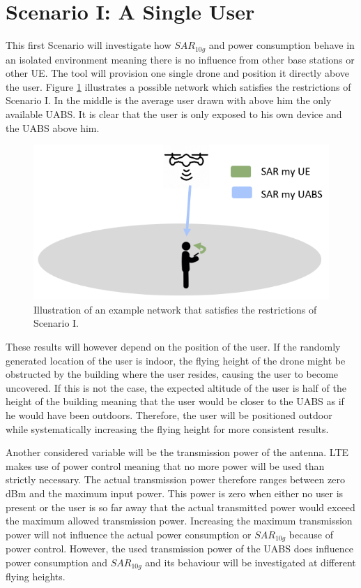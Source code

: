 \section{Scenario I: A Single User}
\label{sec:scenarios_s1}

This first Scenario will investigate how $SAR_{10g}$ and power consumption behave in an isolated environment meaning there is no influence 
from other base stations or other \gls{UE}. The tool will provision one single drone and position it directly above the user.
Figure \ref{fig:IllustrationS1} illustrates a possible network which satisfies the restrictions of Scenario I. In the middle is the average user drawn with above him the only available \gls{UABS}.
It is clear that the user is only exposed to his own device and the \gls{UABS} above him.
\begin{figure}[H]
\centering
  \includegraphics[width=\textwidth/3*2]{../images/IllustrationS1.png}
  \caption{Illustration of an example network that satisfies the restrictions of Scenario I.}
  \label{fig:IllustrationS1}
\end{figure}


These results will however depend on the position of the user. If the randomly generated location of the user is indoor, 
the flying height of the drone might be obstructed by the building where the user resides, causing the user to become uncovered. If this is not the case,
the expected altitude of the user is half of the height of the building meaning that the user would be closer to the \gls{UABS} as 
if he would have been outdoors. Therefore, the user will be positioned outdoor while systematically 
increasing the flying height for more consistent results.

Another considered variable will be the transmission power of the antenna.
\gls{LTE} makes use of power control meaning that no more power will be used than strictly necessary. The actual 
transmission power therefore ranges between zero dBm and the maximum input power. This power is zero when either no user is 
present or the user is so far away that the actual transmitted power would exceed the maximum allowed transmission power.
Increasing the maximum transmission power will not influence the actual power consumption or $SAR_{10g}$ because 
of power control. However, the used transmission power of the \gls{UABS}
does influence power consumption and $SAR_{10g}$ and its behaviour will be investigated at different flying heights.


